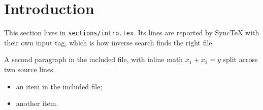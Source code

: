 \section{Introduction}
This section lives in \texttt{sections/intro.tex}. Its lines are
reported by SyncTeX with their own input tag, which is how inverse
search finds the right file.

A second paragraph in the included file, with inline math $x_1 +
x_2 = y$ split across two source lines.
\begin{itemize}
  \item an item in the included file;
  \item another item.
\end{itemize}

